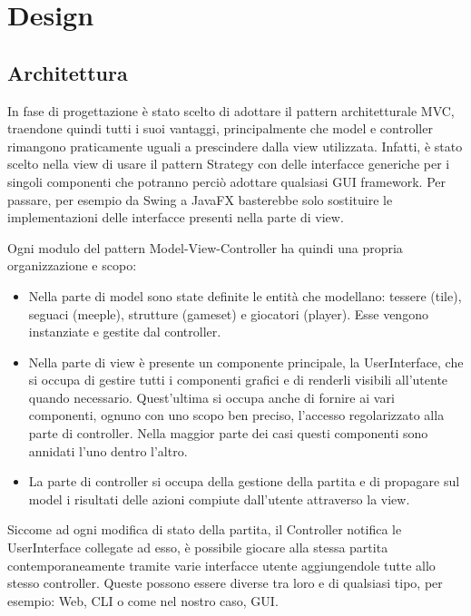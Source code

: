 \section{Design}
\subsection{Architettura}
In fase di progettazione è stato scelto di adottare il pattern architetturale MVC, traendone quindi tutti i suoi vantaggi, principalmente che model e controller rimangono praticamente uguali a prescindere dalla view utilizzata. Infatti, è stato scelto nella view di usare il pattern Strategy con delle interfacce generiche per i singoli componenti che potranno perciò adottare qualsiasi GUI framework. Per passare, per esempio da Swing a JavaFX basterebbe solo sostituire le implementazioni delle interfacce presenti nella parte di view.
\medskip

Ogni modulo del pattern Model-View-Controller ha quindi una propria organizzazione e scopo:
\begin{itemize}
    \item Nella parte di model sono state definite le entità che modellano: tessere (tile), seguaci (meeple), strutture (gameset) e giocatori (player). Esse vengono instanziate e gestite dal controller.
    \item Nella parte di view è presente un componente principale, la UserInterface, che si occupa di gestire tutti i componenti grafici e di renderli visibili all'utente quando necessario. Quest'ultima si occupa anche di fornire ai vari componenti, ognuno con uno scopo ben preciso, l'accesso regolarizzato alla parte di controller. Nella maggior parte dei casi questi componenti sono annidati l'uno dentro l'altro.
    \item La parte di controller si occupa della gestione della partita e di propagare sul model i risultati delle azioni compiute dall'utente attraverso la view.
\end{itemize}
Siccome ad ogni modifica di stato della partita, il Controller notifica le UserInterface collegate ad esso, è possibile giocare alla stessa partita contemporaneamente tramite varie interfacce utente aggiungendole tutte allo stesso controller. Queste possono essere diverse tra loro e di qualsiasi tipo, per esempio: Web, CLI o come nel nostro caso, GUI.

